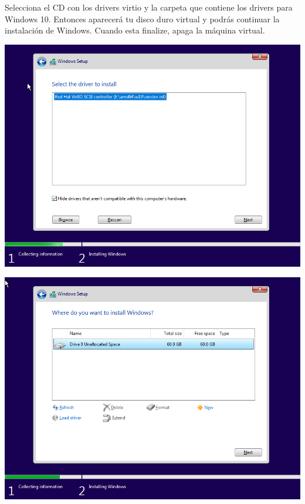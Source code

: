 \documentclass[12pt]{article}
\begin{document}
Selecciona el CD con los drivers virtio y la carpeta que contiene los drivers para Windows 10. Entonces aparecerá tu disco duro virtual y podrás continuar la instalación de Windows. Cuando esta finalize, apaga la máquina virtual.

\begin{multicols}{2}
\begin{minipage}[t]{\linewidth}%
\vspace{0pt}
\centering
\includegraphics[width=\textwidth]{images/windows-setup-03.png}
\end{minipage}
\begin{minipage}[t]{\linewidth}%
\vspace{0pt}
\centering
\includegraphics[width=\textwidth]{images/windows-setup-04.png}
\end{minipage}
\end{multicols}
\end{document}
